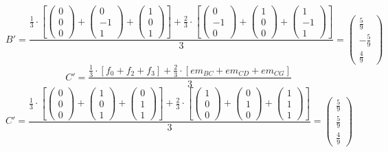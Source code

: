 \documentclass{article}
\begin{document}
\[B'=\frac{\frac{1}{3}\cdot\left[
\left({\begin{array}{c} 0 \\  0 \\ 0 \end{array}}\right)+
\left({\begin{array}{c} 0 \\  -1 \\ 1 \end{array}}\right)+
\left({\begin{array}{c} 1 \\  0 \\ 1 \end{array}}\right)\right]+
\frac{2}{3}\cdot\left[
\left({\begin{array}{c} 0 \\  -1 \\ 0 \end{array}}\right)+
\left({\begin{array}{c} 1 \\  0 \\ 0 \end{array}}\right)+
\left({\begin{array}{c} 1 \\  -1 \\ 1 \end{array}}\right)\right]
}{3}=\left({\begin{array}{c} \frac{5}{9} \\  -\frac{5}{9} \\ \frac{4}{9} \end{array}}\right)\]
\[C'=\frac{\frac{1}{3}\cdot\left[f_0+f_2+f_3\right]+
\frac{2}{3}\cdot\left[em_{BC}+em_{CD}+em_{CG}\right]
}{3}\]
\[C'=\frac{\frac{1}{3}\cdot\left[
\left({\begin{array}{c} 0 \\  0 \\ 0 \end{array}}\right)+
\left({\begin{array}{c} 1 \\  0 \\ 1 \end{array}}\right)+
\left({\begin{array}{c} 0 \\  1 \\ 1 \end{array}}\right)\right]+
\frac{2}{3}\cdot\left[
\left({\begin{array}{c} 1 \\  0 \\ 0 \end{array}}\right)+
\left({\begin{array}{c} 0 \\  1 \\ 0 \end{array}}\right)+
\left({\begin{array}{c} 1 \\  1 \\ 1 \end{array}}\right)\right]
}{3}=\left({\begin{array}{c} \frac{5}{9} \\  \frac{5}{9} \\ \frac{4}{9} \end{array}}\right)\]
\end{document}
